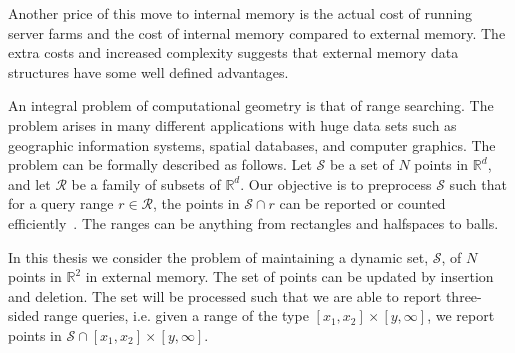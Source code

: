 \documentclass[twoside,11pt,openright]{report}
\begin{document}
Another price of this move to internal memory is the actual cost of running server farms and the cost of internal memory compared to external memory. The extra costs and increased complexity suggests that external memory data structures have some well defined advantages.

An integral problem of computational geometry is that of range searching. The problem arises in many different applications with huge data sets such as geographic information systems, spatial databases, and computer graphics. The problem can be formally described as follows. Let $\mathcal{S}$ be a set of $N$ points in $\mathbb{R}^d$, and let $\mathcal{R}$ be a family of subsets of $\mathbb{R}^d$. Our objective is to preprocess $\mathcal{S}$ such that for a query range $r \in \mathcal{R}$, the points in $\mathcal{S} \cap r$ can be reported or counted efficiently~\cite{Agarwal99geometricrange}. The ranges can be anything from rectangles and halfspaces to balls.

In this thesis we consider the problem of maintaining a dynamic set, $\mathcal{S}$, of $N$ points in $\mathbb{R}^2$ in external memory. The set of points can be updated by insertion and deletion. The set will be processed such that we are able to report three-sided range queries, i.e. given a range of the type $[x_1,x_2] \times [y,\infty]$, we report points in $\mathcal{S} \cap [x_1,x_2] \times [y,\infty]$.
\end{document}
